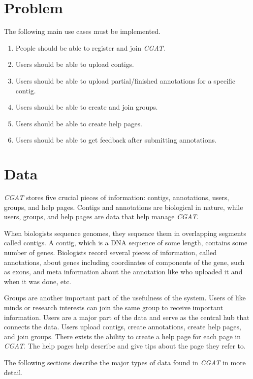 \documentclass[12pt]{ucthesis}
\begin{document}
\section{Problem}

The following main use cases must be implemented.

\begin{enumerate}
\item People should be able to register and join \textit{CGAT}.
\item Users should be able to upload contigs.
\item Users should be able to upload partial/finished annotations for a specific contig.
\item Users should be able to create and join groups.
\item Users should be able to create help pages.
\item Users should be able to get feedback after submitting annotations.
\end{enumerate}

\section{Data}
\textit{CGAT} stores five crucial pieces of information: contigs, annotations,
users, groups, and help pages. Contigs and annotations are biological in nature, while
users, groups, and help pages are data that help manage \textit{CGAT}.

When biologists sequence genomes, they sequence them in overlapping segments
called contigs. A contig, which is a DNA sequence of some length, contains some
number of genes. Biologists record several pieces of information, called
annotations, about genes including coordinates of components of the gene, such
as exons, and meta information about the annotation like who uploaded it and
when it was done, etc.

Groups are another important part of the usefulness of the system. Users of
like minds or research interests can join the same group to receive important
information. Users are a major part of the data and serve as the central hub that connects the
data. Users upload contigs, create annotations, create help pages, and join groups.
There exists the ability to create a help page for each page in \textit{CGAT}. The help
pages help describe and give tips about the page they refer to.

The following sections describe the major types of data found in \textit{CGAT} in more detail.
\end{document}
